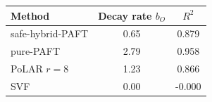 \begin{tabular}{lcc}
\toprule
\textbf{Method} & \textbf{Decay rate $b_O$} & $R^2$ \\
\midrule
safe-hybrid-PAFT & 0.65 & 0.879 \\
pure-PAFT & 2.79 & 0.958 \\
PoLAR $r{=}8$ & 1.23 & 0.866 \\
SVF & 0.00 & -0.000 \\
\bottomrule
\end{tabular}